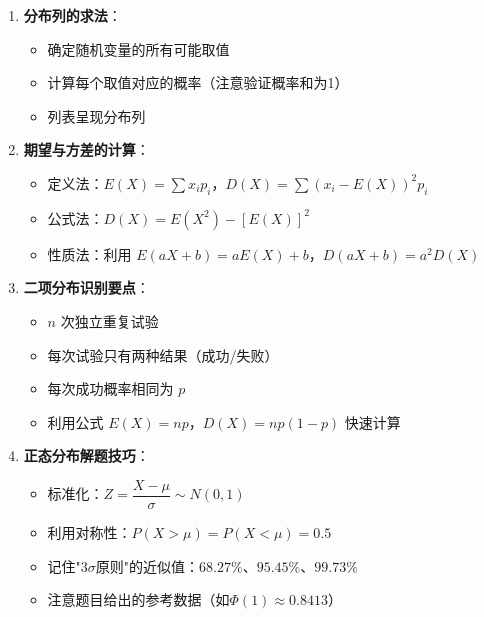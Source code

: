 \documentclass[11pt]{ctexrep}
\begin{document}
\begin{enumerate}
    \item \textbf{分布列的求法}：
    \begin{itemize}
        \item 确定随机变量的所有可能取值
        \item 计算每个取值对应的概率（注意验证概率和为1）
        \item 列表呈现分布列
    \end{itemize}
    
    \item \textbf{期望与方差的计算}：
    \begin{itemize}
        \item 定义法：$E(X) = \sum x_i p_i$，$D(X) = \sum (x_i - E(X))^2 p_i$
        \item 公式法：$D(X) = E(X^2) - [E(X)]^2$
        \item 性质法：利用 $E(aX+b) = aE(X)+b$，$D(aX+b) = a^2D(X)$
    \end{itemize}
    
    \item \textbf{二项分布识别要点}：
    \begin{itemize}
        \item $n$ 次独立重复试验
        \item 每次试验只有两种结果（成功/失败）
        \item 每次成功概率相同为 $p$
        \item 利用公式 $E(X) = np$，$D(X) = np(1-p)$ 快速计算
    \end{itemize}
    
    \item \textbf{正态分布解题技巧}：
    \begin{itemize}
        \item 标准化：$Z = \dfrac{X - \mu}{\sigma} \sim N(0, 1)$
        \item 利用对称性：$P(X > \mu) = P(X < \mu) = 0.5$
        \item 记住"$3\sigma$原则"的近似值：$68.27\%$、$95.45\%$、$99.73\%$
        \item 注意题目给出的参考数据（如$\Phi(1) \approx 0.8413$）
    \end{itemize}
\end{enumerate}
\end{document}
